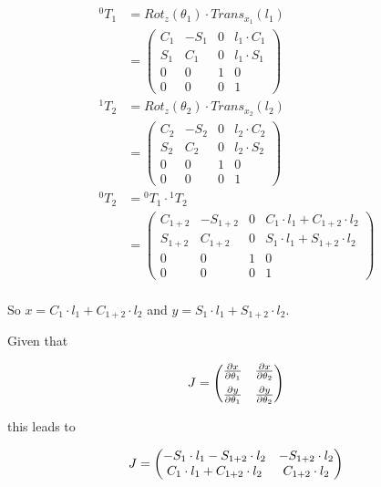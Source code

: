 \documentclass[a4paper,11pt]{article}
\begin{document}
\begin {enumerate}
\begin{enumerate}
				\begin{align*}
					{^0T_1} &= Rot_{z}(\theta_1) \cdot Trans_{x_1}(l_1)\\
					&= \begin{pmatrix}
						C_1 & -S_1 & 0 & l_1 \cdot C_1\\
						S_1 & C_1 & 0 & l_1 \cdot S_1\\
						0 & 0 & 1 & 0\\
						0 & 0 & 0 & 1
					\end{pmatrix}\\
					{^1T_2} &= Rot_{z}(\theta_2) \cdot Trans_{x_2}(l_2)\\
					&= \begin{pmatrix}
						C_2 & -S_2 & 0 & l_2 \cdot C_2\\
						S_2 & C_2 & 0 & l_2 \cdot S_2\\
						0 & 0 & 1 & 0\\
						0 & 0 & 0 & 1
					\end{pmatrix}\\
					{^0T_2} &= {^0T_1} \cdot {^1T_2}\\
					&= \begin{pmatrix}
						C_{1+2} & -S_{1+2} & 0 & C_1 \cdot l_1 + C_{1+2} \cdot l_2 \\
						S_{1+2} & C_{1+2} & 0 & S_1 \cdot l_1 + S_{1+2} \cdot l_2 \\
						0 & 0 & 1 & 0\\
						0 & 0 & 0 & 1
					\end{pmatrix}\\
				\end{align*}
				
				So $x = C_1 \cdot l_1 + C_{1+2} \cdot l_2$ and $y = S_1 \cdot l_1 + S_{1+2} \cdot l_2$.
				
				Given that
				
				$$J = \begin{pmatrix}
					\frac{\partial x}{\partial \theta_1} & \frac{\partial x}{\partial \theta_2} \\[6pt]
					\frac{\partial y}{\partial \theta_1} & \frac{\partial y}{\partial \theta_2}
				\end{pmatrix} \\$$
					
				this leads to
				
				$$J = \begin{pmatrix}
					-S_1 \cdot l_1 - S_{1+2} \cdot l_2 & -S_{1+2} \cdot l_2 \\
					C_1 \cdot l_1 + C_{1+2} \cdot l_2 & C_{1+2} \cdot l_2 \\
				\end{pmatrix} \\$$
				

\end{enumerate}
\end{enumerate}
\end{document}
